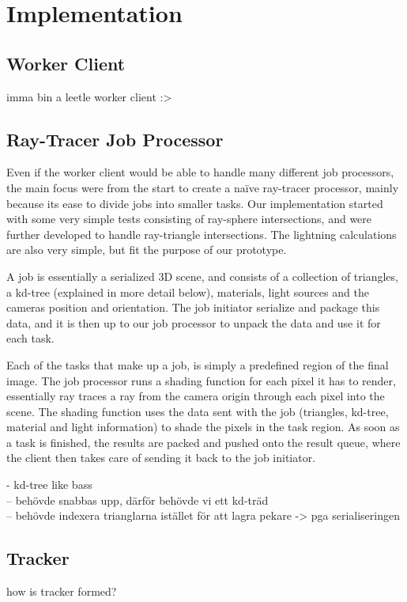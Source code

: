 \chapter{Implementation}

\section{Worker Client}
imma bin a leetle worker client :>

\section{Ray-Tracer Job Processor}
Even if the worker client would be able to handle many different job processors, the main focus were from the start to create a naïve ray-tracer processor, mainly because its ease to divide jobs into smaller tasks. Our implementation started with some very simple tests consisting of ray-sphere intersections, and were further developed to handle ray-triangle intersections. The lightning calculations are also very simple, but fit the purpose of our prototype.

A job is essentially a serialized 3D scene, and consists of a collection of triangles, a kd-tree (explained in more detail below), materials, light sources and the cameras position and orientation. The job initiator serialize and package this data, and it is then up to our job processor to unpack the data and use it for each task.

Each of the tasks that make up a job, is simply a predefined region of the final image. The job processor runs a shading function for each pixel it has to render, essentially ray traces a ray from the camera origin through each pixel into the scene. The shading function uses the data sent with the job (triangles, kd-tree, material and light information) to shade the pixels in the task region. As soon as a task is finished, the results are packed and pushed onto the result queue, where the client then takes care of sending it back to the job initiator.

- kd-tree like bass\\
  -- behövde snabbas upp, därför behövde vi ett kd-träd\\
  -- behövde indexera trianglarna istället för att lagra pekare -> pga serialiseringen\\
  
  

\section{Tracker}
how is tracker formed?